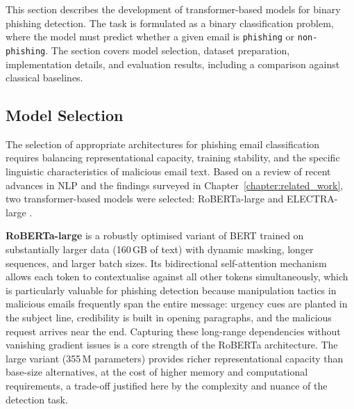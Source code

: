 This section describes the development of transformer-based models for binary phishing detection. The task is formulated as a binary classification problem, where the model must predict whether a given email is \texttt{phishing} or \texttt{non-phishing}. The section covers model selection, dataset preparation, implementation details, and evaluation results, including a comparison against classical baselines.

\subsection{Model Selection}
\label{sec:spam_model_selection}

The selection of appropriate architectures for phishing email classification requires balancing representational capacity, training stability, and the specific linguistic characteristics of malicious email text. Based on a review of recent advances in \ac{NLP} and the findings surveyed in Chapter~\ref{chapter:related_work}, two transformer-based models were selected: \acs{RoBERTa}-large \cite{liu2019roberta} and \acs{ELECTRA}-large \cite{clark2020electra}.

\textbf{\acs{RoBERTa}-large} is a robustly optimised variant of \acs{BERT} trained on substantially larger data (160\,GB of text) with dynamic masking, longer sequences, and larger batch sizes. Its bidirectional self-attention mechanism allows each token to contextualise against all other tokens simultaneously, which is particularly valuable for phishing detection because manipulation tactics in malicious emails frequently span the entire message: urgency cues are planted in the subject line, credibility is built in opening paragraphs, and the malicious request arrives near the end. Capturing these long-range dependencies without vanishing gradient issues is a core strength of the RoBERTa architecture. The large variant (355\,M parameters) provides richer representational capacity than base-size alternatives, at the cost of higher memory and computational requirements, a trade-off justified here by the complexity and nuance of the detection task.

